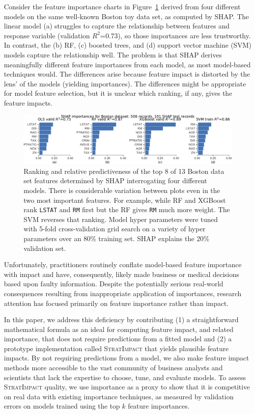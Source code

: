 \documentclass[11pt]{article}
\newcommand{\figref}[1]{Figure~\ref{#1}}
\newcommand{\simp}{\fontfamily{cmr}\textsc{\small StratImpact}}
\begin{document}
Consider the feature importance charts in \figref{fig:diff-models} derived from four different models on the same well-known Boston toy data set, as computed by SHAP. The linear model (a) struggles to capture the relationship between features and response variable (validation $R^2$=0.73), so those importances are less trustworthy.  In contrast, the (b) RF, (c) boosted trees, and (d) support vector machine (SVM) models capture the relationship well. The problem is that SHAP derives meaningfully different feature importances from each model, as most model-based techniques would. The differences arise because feature impact is distorted by the lens' of the models (yielding importances). The differences might be appropriate for model feature selection, but it is unclear which ranking, if any, gives the feature impacts. 

\begin{figure}[htbp]
\begin{center}
\includegraphics[scale=0.6]{images/diff-models.pdf}
\vspace{-3mm}
\caption{\small Ranking and relative predictiveness of the top 8 of 13 Boston data set features determined by SHAP interrogating four different models.  There is considerable variation between plots even in the two most important features. For example, while RF and XGBoost rank {\tt LSTAT} and {\tt RM} first but the RF gives {\tt RM} much more weight. The SVM reverses that ranking. Model hyper parameters were tuned with 5-fold cross-validation grid search on a variety of hyper parameters over an 80\% training set.  SHAP explains the 20\% validation set.}
\label{fig:diff-models}
\end{center}
\end{figure}

Unfortunately, practitioners routinely conflate model-based feature importance with impact and have, consequently, likely made business or medical decisions based upon faulty information. Despite the potentially serious real-world consequences resulting from inappropriate application of importances, research attention has focused primarily on feature importance rather than impact. 

In this paper, we address this deficiency by contributing (1) a straightforward mathematical formula as an ideal for computing feature impact, and related importance, that does not require predictions from a fitted model and (2) a prototype implementation called \simp{} that yields plausible feature impacts. By not requiring predictions from a model, we also make feature impact methods more accessible to the vast  community of business analysts and scientists that lack the expertise to choose, tune, and evaluate models. To assess \simp{} quality, we use importance as a proxy to show that it is competitive on real data with existing importance techniques, as measured by validation errors on models trained using the top $k$ feature importances.  
\end{document}
